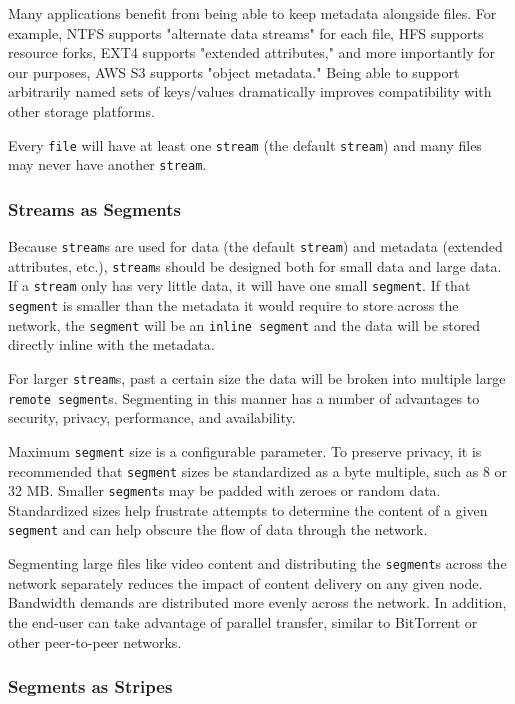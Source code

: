 \documentclass[a4paper,10pt]{article}
\newcommand{\x}[1]{{\tt #1}}
\begin{document}
Many applications benefit from being able to keep metadata alongside files.
For example, NTFS supports "alternate data streams" for each file, HFS supports
resource forks, EXT4 supports "extended attributes," and more importantly for
our purposes, AWS S3 supports "object metadata."\cite{s3-object-meta} Being
able to support arbitrarily named sets of keys/values dramatically improves
compatibility with other storage platforms.

Every \x{file} will have at least one \x{stream} (the default \x{stream}) and
many files may never have another \x{stream}.

\subsubsection{Streams as Segments}

Because \x{stream}s are used for data (the default \x{stream}) and metadata
(extended attributes, etc.), \x{stream}s should be designed both for small data
and large data. If a \x{stream} only has very little data, it will have one
small \x{segment}. If that \x{segment} is smaller than the metadata it would
require to store across the network, the \x{segment} will be an
\x{inline segment} and the data will be stored directly inline with the
metadata.

For larger \x{stream}s, past a certain size the data will be broken into
multiple large \x{remote segment}s. Segmenting in this manner has a number of
advantages to security, privacy, performance, and availability.

Maximum \x{segment} size is a configurable parameter. To preserve privacy, it is
recommended that \x{segment} sizes be standardized as a byte multiple, such as 8
or 32 MB. Smaller \x{segment}s may be padded with zeroes or random data.
Standardized sizes help frustrate attempts to determine the content of a given
\x{segment} and can help obscure the flow of data through the network.

Segmenting large files like video content and distributing the \x{segment}s
across the network separately reduces the impact of content delivery on any
given node.
Bandwidth demands are distributed more evenly across the network. In addition,
the end-user can take advantage of parallel transfer, similar to
BitTorrent\cite{24} or other peer-to-peer networks.

\subsubsection{Segments as Stripes}
\end{document}
